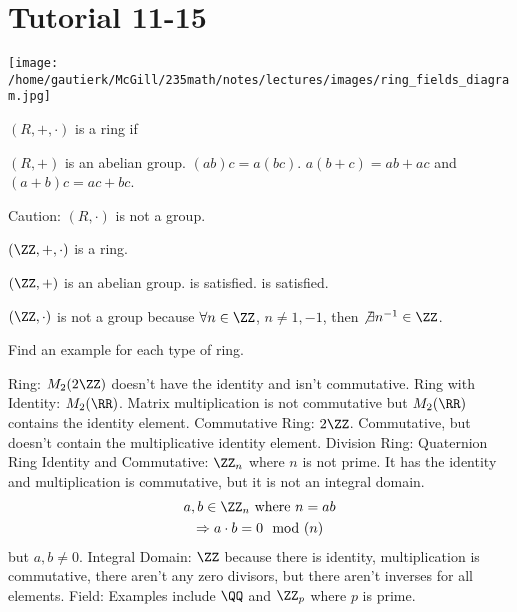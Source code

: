 \documentclass[class=scrartcl, crop=false]{standalone}
\date{2019-11-15}
\begin{document}
\section{Tutorial 11-15}

\texttt{[image: /home/gautierk/McGill/235math/notes/lectures/images/ring\_fields\_diagram.jpg]}

\begin{definition}
  $(R, + , \cdot)$ is a ring if
  \begin{enumerate}
    \ii $(R, +)$ is an abelian group.
    \ii $(ab)c = a(bc)$.
    \ii $a(b + c) = ab + ac$ and $(a + b)c = ac + bc$.
  \end{enumerate} 
\end{definition} 

Caution: $(R, \cdot)$ is not a group.

\begin{example}
  $(\ZZ, +, \cdot)$ is a ring.
  \begin{enumerate}
    \ii $(\ZZ, +)$ is an abelian group.
     is satisfied.
     is satisfied.
  \end{enumerate} 
\end{example} 
\begin{example}
  $(\ZZ, \cdot)$ is not a group because $\forall n \in \ZZ$, $n \neq 1, -1$, then $\not\exists n^{-1} \in \ZZ$.
\end{example} 

\begin{exercise}
  Find an example for each type of ring.

  \begin{enumerate}
    \ii Ring: $M_2(2\ZZ)$ doesn't have the identity and isn't commutative.
    \ii Ring with Identity: $M_2(\RR)$. Matrix multiplication is not commutative but $M_2(\RR)$ contains the identity element.
    \ii Commutative Ring: $2\ZZ$. Commutative, but doesn't contain the multiplicative identity element.
    \ii Division Ring: Quaternion Ring
    \ii Identity and Commutative: $\ZZ_n$ where $n$ is not prime. It has the identity and multiplication is commutative, but it is not an integral domain.
    \begin{gather*}
      a, b \in \ZZ_n \ \text{where} \ n = ab \\
      \Rightarrow a \cdot b = 0 \mod(n)
    \end{gather*} but $a, b \neq 0$.
    \ii Integral Domain: $\ZZ$ because there is identity, multiplication is commutative, there aren't any zero divisors, but there aren't inverses for all elements.
    \ii Field: Examples include $\QQ$ and $\ZZ_p$ where $p$ is prime.
  \end{enumerate} 
\end{exercise} 
\end{document}
